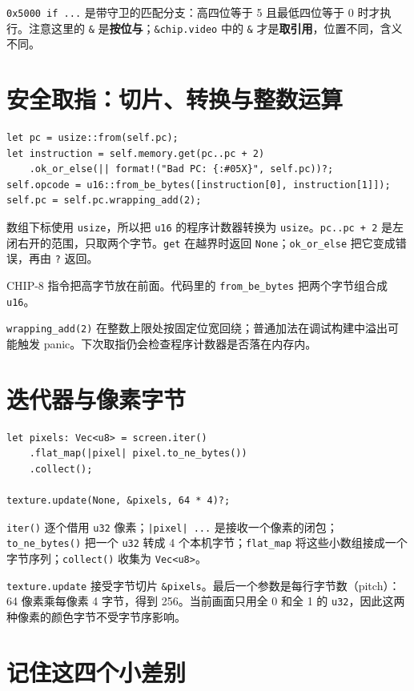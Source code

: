 \documentclass[UTF8,11pt,a4paper]{ctexart}
\begin{document}
\texttt{0x5000 if ...} 是带守卫的匹配分支：高四位等于 5 且最低四位等于 0 时才执行。注意这里的 \texttt{\&} 是\textbf{按位与}；\texttt{\&chip.video} 中的 \texttt{\&} 才是\textbf{取引用}，位置不同，含义不同。

\newpage
\section{安全取指：切片、转换与整数运算}

\begin{lstlisting}
let pc = usize::from(self.pc);
let instruction = self.memory.get(pc..pc + 2)
    .ok_or_else(|| format!("Bad PC: {:#05X}", self.pc))?;
self.opcode = u16::from_be_bytes([instruction[0], instruction[1]]);
self.pc = self.pc.wrapping_add(2);
\end{lstlisting}

数组下标使用 \texttt{usize}，所以把 \texttt{u16} 的程序计数器转换为 \texttt{usize}。\texttt{pc..pc + 2} 是左闭右开的范围，只取两个字节。\texttt{get} 在越界时返回 \texttt{None}；\texttt{ok\_or\_else} 把它变成错误，再由 \texttt{?} 返回。

CHIP-8 指令把高字节放在前面。代码里的 \texttt{from\_be\_bytes} 把两个字节组合成 \texttt{u16}。

\texttt{wrapping\_add(2)} 在整数上限处按固定位宽回绕；普通加法在调试构建中溢出可能触发 panic。下次取指仍会检查程序计数器是否落在内存内。

\section{迭代器与像素字节}

\begin{lstlisting}
let pixels: Vec<u8> = screen.iter()
    .flat_map(|pixel| pixel.to_ne_bytes())
    .collect();

texture.update(None, &pixels, 64 * 4)?;
\end{lstlisting}

\texttt{iter()} 逐个借用 \texttt{u32} 像素；\texttt{|pixel| ...} 是接收一个像素的闭包；\texttt{to\_ne\_bytes()} 把一个 \texttt{u32} 转成 4 个本机字节；\texttt{flat\_map} 将这些小数组接成一个字节序列；\texttt{collect()} 收集为 \texttt{Vec<u8>}。

\texttt{texture.update} 接受字节切片 \texttt{\&pixels}。最后一个参数是每行字节数（pitch）：64 像素乘每像素 4 字节，得到 256。当前画面只用全 0 和全 1 的 \texttt{u32}，因此这两种像素的颜色字节不受字节序影响。

\section{记住这四个小差别}
\end{document}
